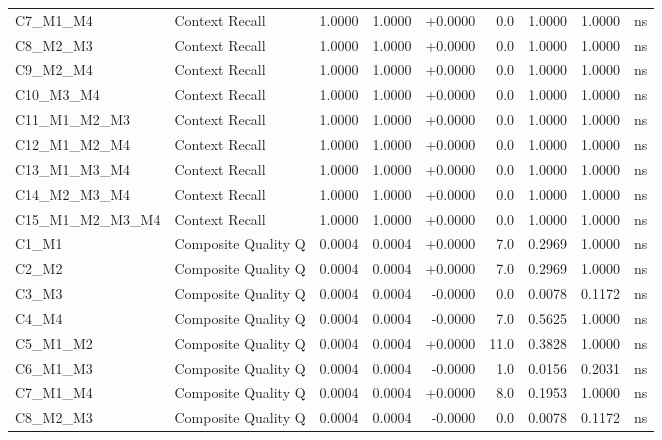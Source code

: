 \begin{table}[p]
\begin{tabular*}{\textwidth}{@{\extracolsep{\fill}} l l r r r r r r c @{}}
\addlinespace
C7\_M1\_M4      & Context Recall       & 1.0000 & 1.0000 & +0.0000 & 0.0 & 1.0000 & 1.0000 & ns \\
\addlinespace
C8\_M2\_M3      & Context Recall       & 1.0000 & 1.0000 & +0.0000 & 0.0 & 1.0000 & 1.0000 & ns \\
\addlinespace
C9\_M2\_M4      & Context Recall       & 1.0000 & 1.0000 & +0.0000 & 0.0 & 1.0000 & 1.0000 & ns \\
\addlinespace
C10\_M3\_M4     & Context Recall       & 1.0000 & 1.0000 & +0.0000 & 0.0 & 1.0000 & 1.0000 & ns \\
\addlinespace
C11\_M1\_M2\_M3 & Context Recall       & 1.0000 & 1.0000 & +0.0000 & 0.0 & 1.0000 & 1.0000 & ns \\
\addlinespace
C12\_M1\_M2\_M4 & Context Recall       & 1.0000 & 1.0000 & +0.0000 & 0.0 & 1.0000 & 1.0000 & ns \\
\addlinespace
C13\_M1\_M3\_M4 & Context Recall       & 1.0000 & 1.0000 & +0.0000 & 0.0 & 1.0000 & 1.0000 & ns \\
\addlinespace
C14\_M2\_M3\_M4 & Context Recall       & 1.0000 & 1.0000 & +0.0000 & 0.0 & 1.0000 & 1.0000 & ns \\
\addlinespace
C15\_M1\_M2\_M3\_M4 & Context Recall       & 1.0000 & 1.0000 & +0.0000 & 0.0 & 1.0000 & 1.0000 & ns \\
\addlinespace
C1\_M1          & Composite Quality Q  & 0.0004 & 0.0004 & +0.0000 & 7.0 & 0.2969 & 1.0000 & ns \\
\addlinespace
C2\_M2          & Composite Quality Q  & 0.0004 & 0.0004 & +0.0000 & 7.0 & 0.2969 & 1.0000 & ns \\
\addlinespace
C3\_M3          & Composite Quality Q  & 0.0004 & 0.0004 & -0.0000 & 0.0 & 0.0078 & 0.1172 & ns \\
\addlinespace
C4\_M4          & Composite Quality Q  & 0.0004 & 0.0004 & -0.0000 & 7.0 & 0.5625 & 1.0000 & ns \\
\addlinespace
C5\_M1\_M2      & Composite Quality Q  & 0.0004 & 0.0004 & +0.0000 & 11.0 & 0.3828 & 1.0000 & ns \\
\addlinespace
C6\_M1\_M3      & Composite Quality Q  & 0.0004 & 0.0004 & -0.0000 & 1.0 & 0.0156 & 0.2031 & ns \\
\addlinespace
C7\_M1\_M4      & Composite Quality Q  & 0.0004 & 0.0004 & +0.0000 & 8.0 & 0.1953 & 1.0000 & ns \\
\addlinespace
C8\_M2\_M3      & Composite Quality Q  & 0.0004 & 0.0004 & -0.0000 & 0.0 & 0.0078 & 0.1172 & ns \\

\end{tabular*}
\end{table}
